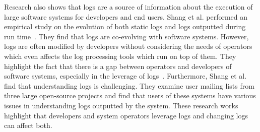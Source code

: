 Research also shows that logs are a source of information about the execution of large software systems for developers and end users. Shang {et al$ . $} performed an empirical study on the evolution of both static logs and logs outputted during run time~\cite{EMSEIAN,PaperIanCIIII}. They find that logs are co-evolving with software systems. However, logs are often modified by developers without considering the needs of operators which even affects the log processing tools which run on top of them. They highlight the fact that there is a gap between operators and developers of software systems, especially in the leverage of logs~\cite{IanGap}. Furthermore, Shang {et al$ . $}~\cite{IanIcesm} find that understanding logs is challenging. They examine user mailing lists from three large open-source projects and find that users of these systems have various issues in understanding logs outputted by the system. These research works highlight that developers and system operators leverage logs and changing logs can affect both.

